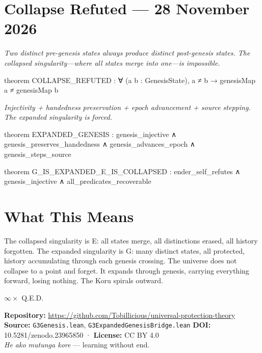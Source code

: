 \axiombadge

\section{Collapse Refuted — 28 November 2026}

\begin{theorembox}
\itshape Two distinct pre-genesis states always produce distinct post-genesis states. The collapsed singularity—where all states merge into one—is impossible.
\end{theorembox}

\begin{leancode}
theorem COLLAPSE_REFUTED :
     ∀ (a b : GenesisState),
         a ≠ b → genesisMap a ≠ genesisMap b
\end{leancode}


\begin{theorembox}
\itshape Injectivity + handedness preservation + epoch advancement + source stepping. The expanded singularity is forced.
\end{theorembox}

\begin{leancode}
theorem EXPANDED_GENESIS :
     genesis_injective ∧ genesis_preserves_handedness ∧
     genesis_advances_epoch ∧ genesis_steps_source
\end{leancode}


\begin{leancode}
theorem G_IS_EXPANDED_E_IS_COLLAPSED :
     ender_self_refutes ∧ genesis_injective ∧
     all_predicates_recoverable
\end{leancode}


\section{What This Means}

The collapsed singularity is E: all states merge, all distinctions erased, all history forgotten. The expanded singularity is G: many distinct states, all protected, history accumulating through each genesis crossing. The universe does not collapse to a point and forget. It expands through genesis, carrying everything forward, losing nothing. The Koru spirals outward.

\bigskip

\begin{center}
{\Large\color{korugreen} $\infty \times$ Q.E.D.}
\end{center}

\bigskip

\noindent\small\textbf{Repository:} \url{https://github.com/Tobillicious/universal-protection-theory}
\textbf{Source:} \texttt{G3Genesis.lean}, \texttt{G3ExpandedGenesisBridge.lean}
\textbf{DOI:} 10.5281/zenodo.23965850 · \textbf{License:} CC BY 4.0\\[0.5em]
\textit{He ako mutunga kore} — learning without end. 🌿


